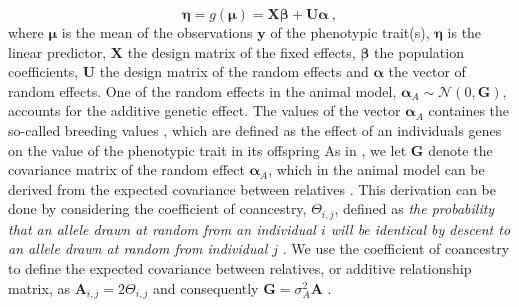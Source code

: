 \begin{equation}
    \boldsymbol{\eta} = g(\boldsymbol{\mu}) = \mathbf{X}\boldsymbol{\beta} + \mathbf{U}\boldsymbol{\alpha}\ ,
\end{equation}
where $\boldsymbol{\mu}$ is the mean of the observations $\mathbf{y}$ of the phenotypic trait(s), $\boldsymbol{\eta}$ is the linear predictor, $\mathbf{X}$ the design matrix of the fixed effects, $\boldsymbol{\beta}$ the population coefficients, $\mathbf{U}$ the design matrix of the random effects and $\boldsymbol{\alpha}$ the vector of random effects.
One of the random effects in the animal model, $\boldsymbol{\alpha}_A \sim \mathcal{N}(0, \mathbf{G})$,  accounts for the additive genetic effect. The values of the vector $\boldsymbol{\alpha}_A$ containes the so-called breeding values \citet{Wilson_guide_animal_model}, which are defined as the effect of an individuals genes on the value of the phenotypic trait in its offspring \citep{ConnerHartl2004} 
As in , we let $\mathbf{G}$ denote the covariance matrix of the random effect $\boldsymbol{\alpha}_A$, which in the animal model can be derived from the expected covariance between relatives \citep{Kruuk2004}.
This derivation can be done by considering the coefficient of coancestry, $\Theta_{i,j}$, defined as \textit{the probability that an allele drawn at random from an individual $i$ will be identical by descent to an allele drawn at random from individual $j$} \citep{Kruuk2004}. 
We use the coefficient of coancestry to define the expected covariance between relatives, or additive relationship matrix, as $\mathbf{A}_{i, j}=2\Theta_{i, j}$ and consequently $\mathbf{G}=\sigma^2_A\mathbf{A}$ \citep{Kruuk2004}. 
